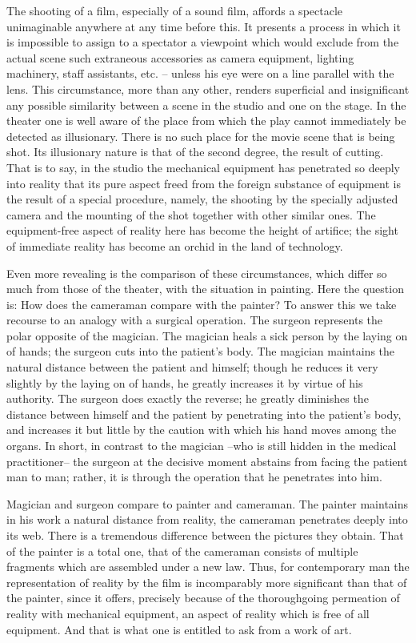 \documentclass[11pt, letterpaper]{article}
\begin{document}
The shooting of a film, especially of a sound film, affords a spectacle
unimaginable anywhere at any time before this. It presents a process in which
it is impossible to assign to a spectator a viewpoint which would exclude from
the actual scene such extraneous accessories as camera equipment, lighting
machinery, staff assistants, etc. – unless his eye were on a line parallel with
the lens. This circumstance, more than any other, renders superficial and
insignificant any possible similarity between a scene in the studio and one on
the stage. In the theater one is well aware of the place from which the play
cannot immediately be detected as illusionary. There is no such place for the
movie scene that is being shot. Its illusionary nature is that of the second
degree, the result of cutting. That is to say, in the studio the mechanical
equipment has penetrated so deeply into reality that its pure aspect freed from
the foreign substance of equipment is the result of a special procedure,
namely, the shooting by the specially adjusted camera and the mounting of the
shot together with other similar ones. The equipment-free aspect of reality
here has become the height of artifice; the sight of immediate reality has
become an orchid in the land of technology.

Even more revealing is the comparison of these circumstances, which differ so
much from those of the theater, with the situation in painting. Here the
question is: How does the cameraman compare with the painter? To answer this we
take recourse to an analogy with a surgical operation. The surgeon represents
the polar opposite of the magician. The magician heals a sick person by the
laying on of hands; the surgeon cuts into the patient’s body. The magician
maintains the natural distance between the patient and himself; though he
reduces it very slightly by the laying on of hands, he greatly increases it by
virtue of his authority. The surgeon does exactly the reverse; he greatly
diminishes the distance between himself and the patient by penetrating into the
patient’s body, and increases it but little by the caution with which his hand
moves among the organs. In short, in contrast to the magician --who is still
hidden in the medical practitioner-- the surgeon at the decisive moment
abstains from facing the patient man to man; rather, it is through the
operation that he penetrates into him.

Magician and surgeon compare to painter and cameraman. The painter maintains in
his work a natural distance from reality, the cameraman penetrates deeply into
its web. There is a tremendous difference between the pictures they obtain.
That of the painter is a total one, that of the cameraman consists of multiple
fragments which are assembled under a new law. Thus, for contemporary man the
representation of reality by the film is incomparably more significant than
that of the painter, since it offers, precisely because of the thoroughgoing
permeation of reality with mechanical equipment, an aspect of reality which is
free of all equipment. And that is what one is entitled to ask from a work of
art.
\end{document}
